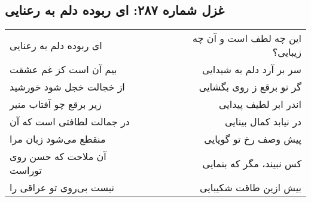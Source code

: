 \begin{center}
\section*{غزل شماره ۲۸۷: ای ربوده دلم به رعنایی}
\label{sec:287}
\begin{longtable}{l p{0.5cm} r}
ای ربوده دلم به رعنایی
&&
این چه لطف است و آن چه زیبایی؟
\\
بیم آن است کز غم عشقت
&&
سر بر آرد دلم به شیدایی
\\
از خجالت خجل شود خورشید
&&
گر تو برقع ز روی بگشایی
\\
زیر برقع چو آفتاب منیر
&&
اندر ابر لطیف پیدایی
\\
در جمالت لطافتی است که آن
&&
در نیابد کمال بینایی
\\
منقطع می‌شود زبان مرا
&&
پیش وصف رخ تو گویایی
\\
آن ملاحت که حسن روی توراست
&&
کس نبیند، مگر که بنمایی
\\
نیست بی‌روی تو عراقی را
&&
بیش ازین طاقت شکیبایی
\\
\end{longtable}
\end{center}
